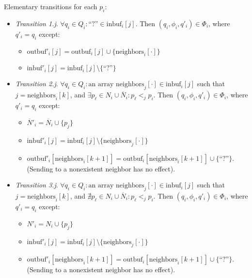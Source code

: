 Elementary transitions for each $p_i$:
\begin{itemize}
\item \emph{Transition 1.j}. $\forall q_i \in Q_i: \text{``?''} \in \text{inbuf}_i[j]$.
      Then $(q_i, \phi_i, q'_i) \in \Phi_i$,
      where $q'_i = q_i$ except:
      \begin{itemize}
      \item $\text{outbuf}'_i[j] = \text{outbuf}_i[j] \cup \{\text{neighbors}_i[\cdot]\}$
      \item $\text{inbuf}'_i[j] = \text{inbuf}_i[j] \setminus \text{\{``?''\}}$
      \end{itemize}
\item \emph{Transition 2.j}. $\forall q_i \in Q_i: \text{an array neighbors}_j[\cdot] \in \text{inbuf}_i[j]$
      such that $j = \text{neighbors}_i[k]$,
      and $\exists p_{\ell} \in N_i \cup \overline{N}_i: p_{\ell} <_j p_i$.
      Then $(q_i, \phi_i, q'_i) \in \Phi_i$,
      where $q'_i = q_i$ except:
      \begin{itemize}
      \item $\overline{N}'_i = \overline{N}_i \cup \{ p_j \}$
      \item $\text{inbuf}'_i[j] = \text{inbuf}_i[j] \setminus \{\text{neighbors}_j[\cdot]\}$
      \item $\text{outbuf}'_i[\text{neighbors}_i[k + 1]] =
             \text{outbuf}_i[\text{neighbors}_i[k + 1]] \cup \text{\{``?''\}}$. (Sending
             to a nonexistent neighbor has no effect).
      \end{itemize}
\item \emph{Transition 3.j}. $\forall q_i \in Q_i: \text{an array neighbors}_j[\cdot] \in \text{inbuf}_i[j]$
      such that $j = \text{neighbors}_i[k]$,
      and $\nexists p_{\ell} \in N_i \cup \overline{N}_i: p_{\ell} <_j p_i$.
      Then $(q_i, \phi_i, q'_i) \in \Phi_i$,
      where $q'_i = q_i$ except:
      \begin{itemize}
      \item $N'_i = N_i \cup \{ p_j \}$
      \item $\text{inbuf}'_i[j] = \text{inbuf}_i[j] \setminus \{\text{neighbors}_j[\cdot]\}$
      \item $\text{outbuf}'_i[\text{neighbors}_i[k + 1]] =
             \text{outbuf}_i[\text{neighbors}_i[k + 1]] \cup \{\text{``?''}\}$. (Sending
             to a nonexistent neighbor has no effect).
      \end{itemize}
\end{itemize}

